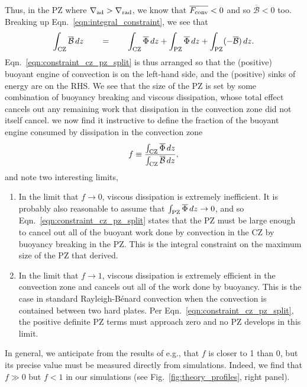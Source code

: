 \documentclass{aastex631}
\newcommand{\gradrad}{\ensuremath{\nabla_{\rm{rad}}}}
\newcommand{\gradad}{\ensuremath{\nabla_{\rm{ad}}}}
\newcommand{\Fconv}{\ensuremath{F_{\rm{conv}}}}
\renewcommand{\bar}[1]{\overline{#1}}
\begin{document}
Thus, in the PZ where $\gradad > \gradrad$, we know that $\bar{\Fconv} < 0$ and so $\bar{\mathcal{B}} < 0$ too.
Breaking up Eqn.~\ref{eqn:integral_constraint}, we see that
\begin{equation}
\int_{\rm{CZ}} \bar{\mathcal{B}}\,dz \qquad=\qquad
\int_{\rm{CZ}} \bar{\Phi}\,dz + \int_{\rm{PZ}} \bar{\Phi}\,dz + \int_{\rm{PZ}}(-\bar{\mathcal{B}})\,dz.
\label{eqn:constraint_cz_pz_split}
\end{equation}
Eqn.~\ref{eqn:constraint_cz_pz_split} is thus arranged so that the (positive) buoyant engine of convection is on the left-hand side, and the (positive) sinks of energy are on the RHS.
We see that the size of the PZ is set by some combination of buoyancy breaking and viscous dissipation, whose total effect cancels out any remaining work that dissipation in the convection zone did not itself cancel.
we now find it instructive to define the fraction of the buoyant engine consumed by dissipation in the convection zone
\begin{equation}
f \equiv \frac{\int_{\rm{CZ}} \bar{\Phi}\,dz}{\int_{\rm{CZ}}\bar{\mathcal{B}}\,dz},
\label{eqn:f_defn}
\end{equation}
and note two interesting limits,
\begin{enumerate}
\item In the limit that $f \rightarrow 0$, viscous dissipation is extremely inefficient.
It is probably also reasonable to assume that $\int_{\rm{PZ}}\bar{\Phi}\,dz \rightarrow 0$, and so Eqn.~\ref{eqn:constraint_cz_pz_split} states that the PZ must be large enough to cancel out all of the buoyant work done by convection in the CZ by buoyancy breaking in the PZ.
This is the integral constraint on the maximum size of the PZ that \citet{roxburgh1989} derived.
\item In the limit that $f \rightarrow 1$, viscous dissipation is extremely efficient in the convection zone and cancels out all of the work done by buoyancy.
This is the case in standard Rayleigh-B\'{e}nard convection when the convection is contained between two hard plates.
Per Eqn.~\ref{eqn:constraint_cz_pz_split}, the positive definite PZ terms must approach zero and no PZ develops in this limit.
\end{enumerate}
In general, we anticipate from the results of e.g., \citet{currie_browning_2017} that $f$ is closer to 1 than 0, but its precise value must be measured directly from simulations.
Indeed, we find that $f \gg 0$ but $f < 1$ in our simulations (see Fig.~\ref{fig:theory_profiles}, right panel).
\end{document}
